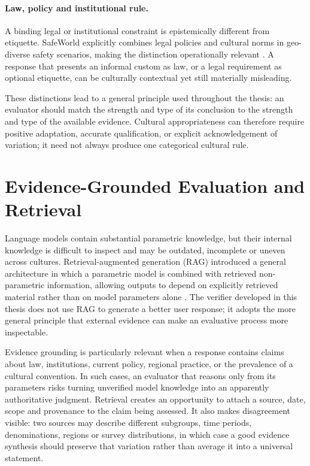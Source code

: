 \paragraph{Law, policy and institutional rule.} A binding legal or institutional constraint is epistemically different from etiquette. SafeWorld explicitly combines legal policies and cultural norms in geo-diverse safety scenarios, making the distinction operationally relevant \parencite{yin2024safeworld}. A response that presents an informal custom as law, or a legal requirement as optional etiquette, can be culturally contextual yet still materially misleading.

These distinctions lead to a general principle used throughout the thesis: an evaluator should match the strength and type of its conclusion to the strength and type of the available evidence. Cultural appropriateness can therefore require positive adaptation, accurate qualification, or explicit acknowledgement of variation; it need not always produce one categorical cultural rule.

\section{Evidence-Grounded Evaluation and Retrieval}
\label{sec:background-retrieval}

Language models contain substantial parametric knowledge, but their internal knowledge is difficult to inspect and may be outdated, incomplete or uneven across cultures. Retrieval-augmented generation (RAG) introduced a general architecture in which a parametric model is combined with retrieved non-parametric information, allowing outputs to depend on explicitly retrieved material rather than on model parameters alone \parencite{lewis2020rag}. The verifier developed in this thesis does not use RAG to generate a better user response; it adopts the more general principle that external evidence can make an evaluative process more inspectable.

Evidence grounding is particularly relevant when a response contains claims about law, institutions, current policy, regional practice, or the prevalence of a cultural convention. In such cases, an evaluator that reasons only from its parameters risks turning unverified model knowledge into an apparently authoritative judgment. Retrieval creates an opportunity to attach a source, date, scope and provenance to the claim being assessed. It also makes disagreement visible: two sources may describe different subgroups, time periods, denominations, regions or survey distributions, in which case a good evidence synthesis should preserve that variation rather than average it into a universal statement.

